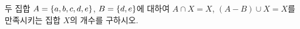 두 집합 $A=\{a{,}\mkern3mu\mathopen{}b{,}\mkern3mu\mathopen{}c{,}\mkern3mu\mathopen{}d{,}\mkern3mu\mathopen{}e\}$, $B=\{d{,}\mkern3mu\mathopen{}e\}$에 대하여 $A\cap X=X$, $(A-B)\cup X=X$를 만족시키는 집합 $X$의 개수를 구하시오.

